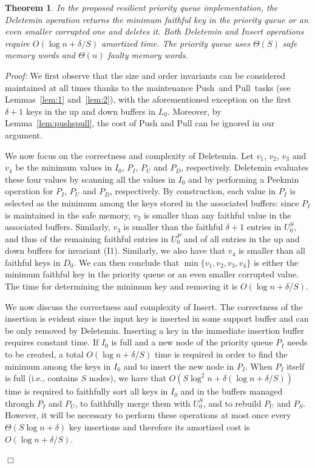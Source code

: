 \documentclass[review,number]{elsarticle}
\newcommand{\BO}[1]{{O}\left(#1\right)}
\newcommand{\BT}[1]{{\Theta}\left(#1\right)}
\newtheorem{theorem}{Theorem}
\renewenvironment{proof}{\begin{trivlist}
                         \item[] {\em Proof:}}{\hfill $\Box$
                       \end{trivlist}}
\newcommand{\Insert}{\textsf{Insert}}
\newcommand{\Deletemin}{\textsf{Deletemin}}
\newcommand{\Push}{\textsf{Push}}
\newcommand{\Pull}{\textsf{Pull}}
\newcommand{\Peekmin}{\textsf{Peekmin}}
\begin{document}
\begin{theorem}
In the proposed resilient priority queue implementation, the \Deletemin{}
operation returns the minimum faithful key in the priority queue or an even
smaller corrupted one and deletes it. Both \Deletemin{} and \Insert{} operations
require $\BO{\log n + \delta / S}$ amortized time. The priority queue uses
$\BT{S}$   safe memory words and $\BT{n}$ faulty memory words.
\end{theorem}
\begin{proof}
We first observe that the size and order invariants can be
considered maintained at all times thanks to the maintenance \Push\ and \Pull\
tasks (see Lemmas~\ref{lem:1} and~\ref{lem:2}), with the aforementioned
exception on the first $\delta+1$ keys in the up and down buffers in $L_0$. 
Moreover, by Lemma~\ref{lem:pushspull},  the cost of \Push{} and \Pull{} can be
ignored in our argument.


We now focus on the correctness and complexity of
\Deletemin{}. Let $v_1$, $v_2$, $v_3$ and $v_4$ be the minimum values in $I_0$,
$P_I$, $P_U$ and $P_D$, respectively. \Deletemin{} evaluates these four values
by scanning all the values in $I_0$ and by performing a \Peekmin{} operation for
$P_I$, $P_U$ and $P_D$, respectively. By construction, each value in $P_{I}$ is
selected as the minimum among the keys stored in the associated buffers: since
$P_{I}$ is maintained in the safe memory, $v_2$ is smaller than any faithful
value in the associated buffers. Similarly, $v_3$ is smaller than the faithful
$\delta+1$ entries in $U_0^S$, and thus of the remaining faithful entries in
$U^P_0$ and of all entries in the up and down buffers for invariant (I1).
Similarly, we also
have that $v_4$ is smaller than all faithful keys in $D_0$. We can then conclude
that $\min\{v_1, v_2, v_3, v_4\}$ is either the minimum faithful key in the
priority queue or an even smaller corrupted value.  The time for determining the
minimum key and removing it is $\BO{\log n + \delta / S}$.

We now discuss  the correctness and complexity of \Insert{}. The correctness of
the  insertion is evident since the input key is inserted in some support buffer
and can be only removed by \Deletemin. Inserting a key in the immediate
insertion buffer requires constant time. If $I_{0}$ is full and a new node of
the priority queue $P_I$ needs to be created, a total $\BO{\log n + \delta / S
}$ time is required in order to find the minimum among the keys in $I_{0}$ and
to insert the new node in $P_{I}$. When $P_I$ itself is full (i.e., contains $S$
nodes), we have that $\BO{S \log^{2} n + \delta\left( \log n + \delta / S
\right)}$ time is  required to faithfully sort all keys in $I_0$ and in the
buffers managed through $P_I$ and $P_U$, to faithfully merge them with
$U^S_{0}$, and to rebuild $P_{U}$ and $P_S$. However, it will be necessary to
perform these operations at most once every $\BT{S\log n +\delta}$ key
insertions and therefore its amortized cost is $\BO{\log n + \delta / S}$. 


\end{proof}
\end{document}
